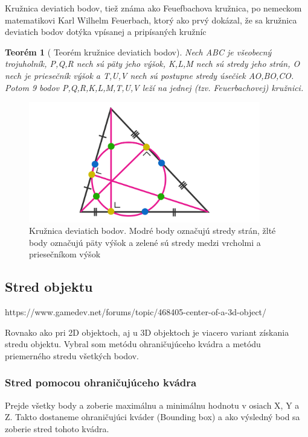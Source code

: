Kružnica deviatich bodov, tiež známa ako Feuefbachova kružnica, po nemeckom matematikovi Karl Wilhelm Feuerbach, ktorý ako prvý dokázal, že sa kružnica deviatich bodov dotýka vpísanej a pripísaných kružníc \cite{NinePointTheorem} 


\newtheorem{theorem}{Teorém}
 
\begin{theorem}[{\cite{https://lms.umb.sk/mod/book/tool/print/index.php?id=76930&chapterid=1746} Teorém kružnice deviatich bodov}]
Nech ABC je všeobecný trojuholník, P,Q,R nech sú päty jeho výšok, K,L,M nech sú stredy jeho strán, O nech je priesečník výšok a T,U,V nech sú postupne stredy úsečiek AO,BO,CO. Potom 9 bodov P,Q,R,K,L,M,T,U,V leží na jednej (tzv. Feuerbachovej) kružnici. 

\end{theorem}


\begin{figure}[H]
	\centering
	\includegraphics[width=0.9\textwidth]{obrazky-figures/NinePointCircle.png}
	\caption{Kružnica deviatich bodov. Modré body označujú stredy strán, žlté body označujú päty výšok a zelené sú stredy medzi vrcholmi a priesečníkom výšok}
	\label{fig:TriangleCenters}
\end{figure}



\subsection{Stred objektu}
https://www.gamedev.net/forums/topic/468405-center-of-a-3d-object/

Rovnako ako pri 2D objektoch, aj u 3D objektoch je viacero variant získania stredu objektu. Vybral som metódu ohraničujúceho kvádra a metódu priemerného stredu všetkých bodov.


\subsubsection{Stred pomocou ohraničujúceho kvádra}
Prejde všetky body a zoberie maximálnu a minimálnu hodnotu v osiach X, Y a Z. Takto dostaneme ohraničujúci kváder (Bounding box) a ako výsledný bod sa zoberie stred tohoto kvádra.

